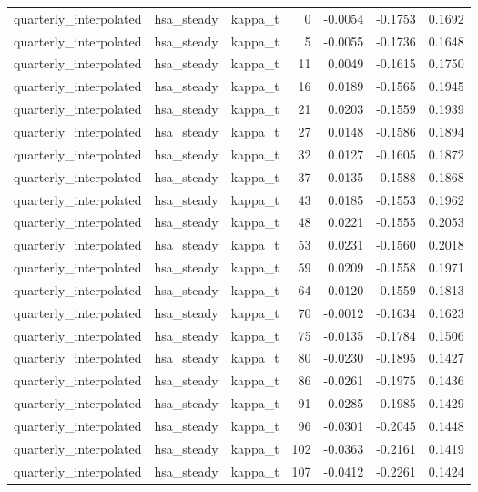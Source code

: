 \begin{tabular}{lllrrrr}
quarterly\_interpolated & hsa\_steady & kappa\_t & 0 & -0.0054 & -0.1753 & 0.1692 \\
quarterly\_interpolated & hsa\_steady & kappa\_t & 5 & -0.0055 & -0.1736 & 0.1648 \\
quarterly\_interpolated & hsa\_steady & kappa\_t & 11 & 0.0049 & -0.1615 & 0.1750 \\
quarterly\_interpolated & hsa\_steady & kappa\_t & 16 & 0.0189 & -0.1565 & 0.1945 \\
quarterly\_interpolated & hsa\_steady & kappa\_t & 21 & 0.0203 & -0.1559 & 0.1939 \\
quarterly\_interpolated & hsa\_steady & kappa\_t & 27 & 0.0148 & -0.1586 & 0.1894 \\
quarterly\_interpolated & hsa\_steady & kappa\_t & 32 & 0.0127 & -0.1605 & 0.1872 \\
quarterly\_interpolated & hsa\_steady & kappa\_t & 37 & 0.0135 & -0.1588 & 0.1868 \\
quarterly\_interpolated & hsa\_steady & kappa\_t & 43 & 0.0185 & -0.1553 & 0.1962 \\
quarterly\_interpolated & hsa\_steady & kappa\_t & 48 & 0.0221 & -0.1555 & 0.2053 \\
quarterly\_interpolated & hsa\_steady & kappa\_t & 53 & 0.0231 & -0.1560 & 0.2018 \\
quarterly\_interpolated & hsa\_steady & kappa\_t & 59 & 0.0209 & -0.1558 & 0.1971 \\
quarterly\_interpolated & hsa\_steady & kappa\_t & 64 & 0.0120 & -0.1559 & 0.1813 \\
quarterly\_interpolated & hsa\_steady & kappa\_t & 70 & -0.0012 & -0.1634 & 0.1623 \\
quarterly\_interpolated & hsa\_steady & kappa\_t & 75 & -0.0135 & -0.1784 & 0.1506 \\
quarterly\_interpolated & hsa\_steady & kappa\_t & 80 & -0.0230 & -0.1895 & 0.1427 \\
quarterly\_interpolated & hsa\_steady & kappa\_t & 86 & -0.0261 & -0.1975 & 0.1436 \\
quarterly\_interpolated & hsa\_steady & kappa\_t & 91 & -0.0285 & -0.1985 & 0.1429 \\
quarterly\_interpolated & hsa\_steady & kappa\_t & 96 & -0.0301 & -0.2045 & 0.1448 \\
quarterly\_interpolated & hsa\_steady & kappa\_t & 102 & -0.0363 & -0.2161 & 0.1419 \\
quarterly\_interpolated & hsa\_steady & kappa\_t & 107 & -0.0412 & -0.2261 & 0.1424 \\

\end{tabular}
